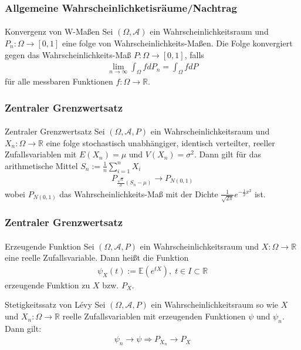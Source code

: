 \documentclass{beamer}
\begin{document}
\begin{frame}
    \frametitle{Allgemeine Wahrscheinlichketisräume/Nachtrag}
\framesubtitle{}

\begin{block}{Konvergenz von W-Maßen}
Sei $(\Omega, \mathcal{A})$ ein Wahrscheinlichkeitsraum und $P_n : \Omega \to [0,1]$ eine folge von Wahrscheinlichkeits-Maßen. Die Folge konvergiert gegen
das Wahrscheinlichkeits-Maß $P: \Omega \to [0,1]$, falls 
\begin{align*}
\lim_{n \to \infty} \int_\Omega f dP_n = \int_\Omega f dP
\end{align*}
für alle messbaren Funktionen $f: \Omega \to \mathbb{R}$.
\end{block}
 \end{frame}



\begin{frame}
    \frametitle{Zentraler Grenzwertsatz}
\framesubtitle{}

\begin{block}{Zentraler Grenzwertsatz}
Sei $(\Omega, \mathcal{A}, P)$ ein Wahrscheinlichkeitsraum und $X_n :  \Omega \to \mathbb{R}$  eine folge stochastisch unabhängiger, identisch verteilter, reeller Zufallsvariablen mit $E(X_n) = \mu$ und $V(X_n)= \sigma^2$. Dann gilt für das arithmetische Mittel $S_n:= \frac{1}{n} \sum_{i=1}^n X_i$
\begin{align*}
P_{ \frac{\sqrt{n}}{\sigma} (S_n-\mu)} \to P_{N(0,1)}
\end{align*}
wobei $ P_{N(0,1)}$ das Wahrscheinlichkeits-Maß mit der Dichte $ \frac {1}{ \sqrt{2\pi}}e^{- \frac {1}{2} x^2}$ ist.
\end{block}

 \end{frame}



\begin{frame}
    \frametitle{Zentraler Grenzwertsatz}
\framesubtitle{}

\begin{block}{Erzeugende Funktion}
Sei $(\Omega, \mathcal{A}, P)$ ein Wahrscheinlichkeitsraum und $X :  \Omega \to \mathbb{R}$  eine reelle Zufallsvariable. Dann heißt die Funktion 
\begin{align*}
\psi_X(t) := \mathbb{E}(e^{tX}), \; t \in I \subset \mathbb{R}
\end{align*}
erzeugende Funktion zu $X$ bzw. $P_X$.
\end{block}

\begin{block}{Stetigkeitssatz von  Lévy }
Sei $(\Omega, \mathcal{A}, P)$ ein Wahrscheinlichkeitsraum so wie  $X$ und $X_n :  \Omega \to \mathbb{R}$   reelle Zufallsvariablen mit erzeugenden Funktionen $\psi$ und $\psi_{n}$. Dann gilt:
\begin{align*}
\psi_n \to \psi \Rightarrow P_{X_n} \to P_X 
\end{align*}
\end{block}

 \end{frame}
\end{document}
